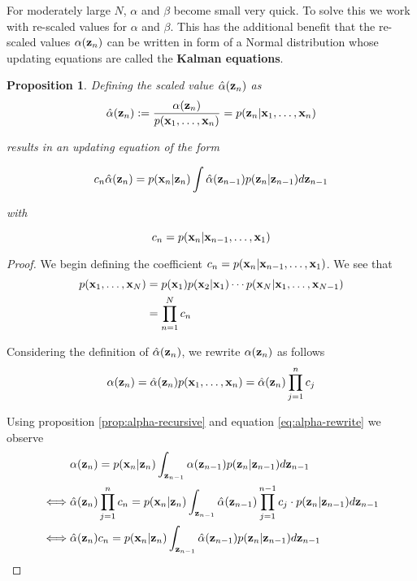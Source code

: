 \documentclass[11pt]{article}
\numberwithin{equation}{section}
\newcommand{\x}{{\bf x}}
\newcommand{\z}{{\bf z}}
\newtheorem{proposition}{Proposition}[section]
\begin{document}
For moderately large $N$, $\alpha$ and $\beta$ become small very quick. To solve this we work with re-scaled values for $\alpha$ and $\beta$. This has the additional benefit that the re-scaled values $\alpha(\z_n)$ can be written in form of a Normal distribution whose updating equations are  called the \textbf{Kalman equations}.


\begin{proposition} \label{prop:alpha-hat}
	Defining the scaled value $\hat\alpha(\z_n)$ as
	\begin{equation}
		\hat\alpha(\z_n) := \frac{\alpha(\z_n)}{p(\x_1, \ldots, \x_n)} = p(\z_n \vert \x_1, \ldots, \x_n)
	\end{equation}
	
	results in an updating equation of the form
	
	\begin{equation}
		 c_n \hat\alpha(\z_n) = p(\x_n\vert\z_n)\int \hat\alpha(\z_{n-1})p(\z_n \vert \z_{n-1}) d\z_{n-1}
	\end{equation}
	
	with
	
	\begin{equation}
		c_n = p(\x_n \vert \x_{n-1}, \ldots, \x_1)
	\end{equation}
\end{proposition}

\begin{proof}
	We begin defining the coefficient $c_n = p(\x_n \vert \x_{n-1}, \ldots, \x_1)$. We see that
	\begin{align}
		p(\x_1, \ldots, \x_N) &=  p(\x_1) p(\x_2 \vert \x_1) \cdots p(\x_N \vert \x_1, \ldots, \x_{N-1})\\
		&= \prod_{n=1}^N c_n
	\end{align}
	
	Considering the definition of $\hat\alpha(\z_n)$, we rewrite $\alpha(\z_n)$ as follows
	\begin{equation} \label{eq:alpha-rewrite}
		\alpha(\z_n) = \hat\alpha(\z_n) p(\x_1, \ldots, \x_n) = \hat\alpha(\z_n) \prod_{j=1}^n c_j
	\end{equation}
	
	Using proposition \ref{prop:alpha-recursive} and equation \eqref{eq:alpha-rewrite} we observe
	\begin{align}
		&\alpha(\z_n) = p(\x_n\vert \z_n) \int_{\z_{n-1}} \alpha(\z_{n-1})p(\z_n\vert\z_{n-1}) d\z_{n-1}\\
		\iff & \hat\alpha(\z_n) \prod_{j=1}^{n} c_n = p(\x_n \vert \z_n) \int_{\z_{n-1}} \hat\alpha(\z_{n-1}) \prod_{j=1}^{n-1} c_j \cdot  p(\z_n\vert\z_{n-1}) d\z_{n-1}\\
		\iff & \hat\alpha(\z_n) c_n =   p(\x_n \vert \z_n) \int_{\z_{n-1}} \hat\alpha(\z_{n-1})   p(\z_n\vert\z_{n-1}) d\z_{n-1}
	\end{align}
	
	
\end{proof}
\end{document}
